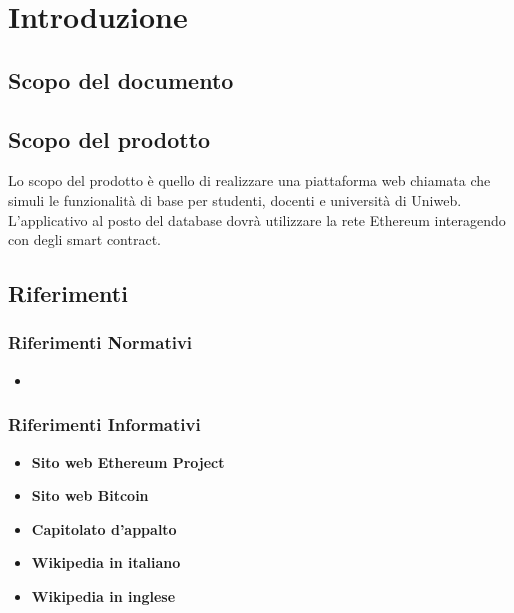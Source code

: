 \documentclass[GlossarioEST.tex]{subfiles}
\begin{document}
\chapter{Introduzione}
\section{Scopo del documento}
\glossExpl
\section{Scopo del prodotto}
Lo scopo del prodotto è quello di realizzare una piattaforma web chiamata \progetto che simuli le funzionalità di base per studenti, docenti e università di Uniweb. L'applicativo al posto del database dovrà utilizzare la rete Ethereum interagendo con degli smart contract.
\section{Riferimenti}
\subsection{Riferimenti Normativi}
\begin{itemize}
	\item \textbf{\ndp \vruno}
\end{itemize}

\subsection{Riferimenti Informativi}
\begin{itemize}
\item \textbf {Sito web Ethereum Project\\
	}
\item \textbf {Sito web Bitcoin\\
	}
\item \textbf {Capitolato d'appalto\\
	}
\item \textbf {Wikipedia in italiano\\
	}
\item \textbf {Wikipedia in inglese\\
	}
\end{itemize}
\end{document}
